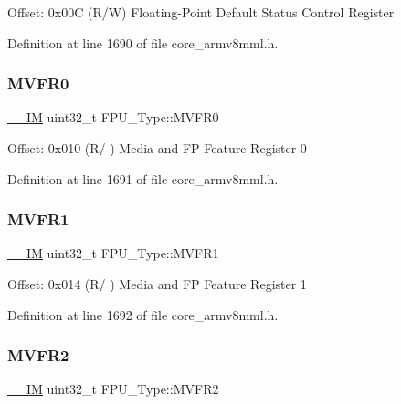 Offset\+: 0x00C (R/W) Floating-\/\+Point Default Status Control Register 

Definition at line 1690 of file core\+\_\+armv8mml.\+h.

\mbox{\label{struct_f_p_u___type_a4f19014defe6033d070b80af19ef627c}} 
\subsubsection{\texorpdfstring{M\+V\+F\+R0}{MVFR0}}
{\footnotesize\ttfamily \hyperlink{core__sc300_8h_a4cc1649793116d7c2d8afce7a4ffce43}{\+\_\+\+\_\+\+IM} uint32\+\_\+t F\+P\+U\+\_\+\+Type\+::\+M\+V\+F\+R0}

Offset\+: 0x010 (R/ ) Media and FP Feature Register 0 

Definition at line 1691 of file core\+\_\+armv8mml.\+h.

\mbox{\label{struct_f_p_u___type_a66f8cfa49a423b480001a4e101bf842d}} 
\subsubsection{\texorpdfstring{M\+V\+F\+R1}{MVFR1}}
{\footnotesize\ttfamily \hyperlink{core__sc300_8h_a4cc1649793116d7c2d8afce7a4ffce43}{\+\_\+\+\_\+\+IM} uint32\+\_\+t F\+P\+U\+\_\+\+Type\+::\+M\+V\+F\+R1}

Offset\+: 0x014 (R/ ) Media and FP Feature Register 1 

Definition at line 1692 of file core\+\_\+armv8mml.\+h.

\mbox{\label{struct_f_p_u___type_a479130e53a8b3c36fd8ee38b503a3911}} 
\subsubsection{\texorpdfstring{M\+V\+F\+R2}{MVFR2}}
{\footnotesize\ttfamily \hyperlink{core__sc300_8h_a4cc1649793116d7c2d8afce7a4ffce43}{\+\_\+\+\_\+\+IM} uint32\+\_\+t F\+P\+U\+\_\+\+Type\+::\+M\+V\+F\+R2}


